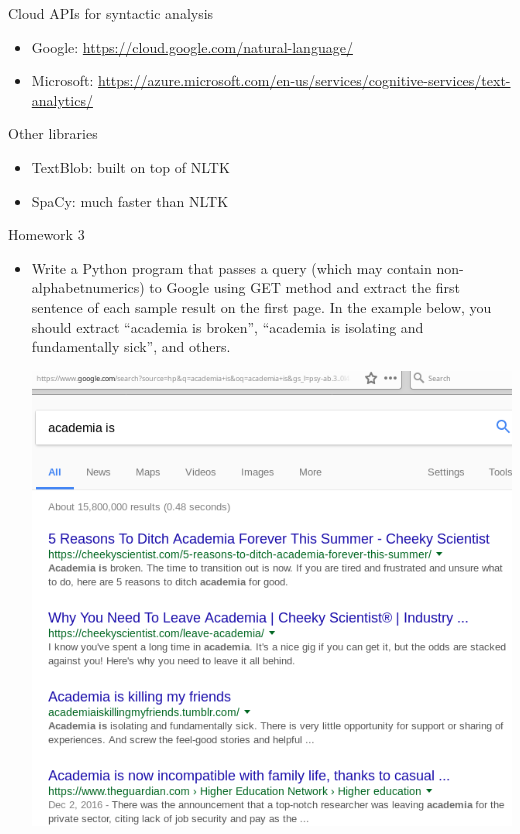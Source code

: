 \documentclass[11pt, handout]{beamer}
\begin{document}
\begin{frame}{Cloud APIs for syntactic analysis}
\begin{itemize}
 \item Google: \url{https://cloud.google.com/natural-language/}
 \item Microsoft: \url{https://azure.microsoft.com/en-us/services/cognitive-services/text-analytics/}
 \end{itemize}
\end{frame}

\begin{frame}{Other libraries}
 \begin{itemize}
  \item TextBlob: built on top of NLTK
  \item SpaCy: much faster than NLTK
 \end{itemize}
\end{frame}


\begin{frame}{Homework  3}
\begin{itemize}
 \item Write a Python program that passes a query (which may contain non-alphabetnumerics) to Google using GET method and extract the first sentence of each sample result on the first page. In the example below, you should extract ``academia is broken'',  ``academia is isolating and fundamentally sick'', and others. 
 
 \includegraphics[width=.5\textwidth]{google_academia.png}
\end{itemize}
 
\end{frame}

% 
\end{document}
